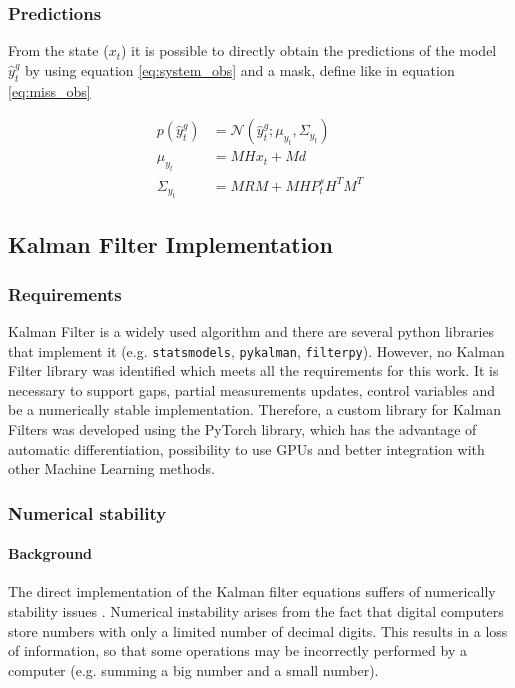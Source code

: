 \documentclass{article}
\newcommand{\norm}[3]{\mathcal{N}\left(#1; #2, #3\right)} %
\let\Oldsubsection\subsection
\renewcommand{\subsection}{\FloatBarrier\Oldsubsection}
\begin{document}
\subsubsection{Predictions}

From the state ($x_t$) it is possible to directly obtain the predictions of the model $\hat{y}^g_t$ by using equation \ref{eq:system_obs} and a mask, define like in equation \ref{eq:miss_obs}

\begin{align}\label{eq:filter_predictions}
    p(\hat{y}^g_t) &= \norm{\hat{y}^g_t}{\mu_{y_t}}{\Sigma_{y_t}} \\
    \mu_{y_t} &= MHx_t + Md \\
    \Sigma_{y_t} &= MRM + MHP^s_tH^TM^T
\end{align}


\subsection{Kalman Filter Implementation}

\subsubsection{Requirements}

Kalman Filter is a widely used algorithm and there are several python libraries that implement it (e.g. \verb|statsmodels|, \verb|pykalman|, \verb|filterpy|). However, no  Kalman Filter library was identified which meets all the requirements for this work. It is necessary to support gaps, partial measurements updates, control variables and be a numerically stable implementation.
Therefore, a custom library for Kalman Filters was developed using the PyTorch library, which has the advantage of automatic differentiation, possibility to use GPUs and better integration with other Machine Learning methods.

\subsubsection{Numerical stability}

\paragraph{Background}
The direct implementation of the Kalman filter equations suffers of numerically stability issues \cite{mohinder_s_grewal_kalman_2001, dan_simon_optimal_2006}. %
Numerical instability arises from the fact that digital computers store numbers with only a limited number of decimal digits. This results in a loss of information, so that some operations may be incorrectly performed by a  computer (e.g. summing a big number and a small number).
\end{document}
